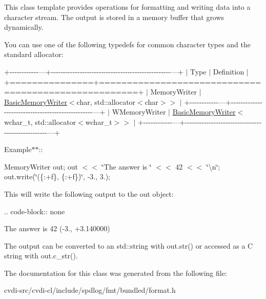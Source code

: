 This class template provides operations for formatting and writing data into a character stream. The output is stored in a memory buffer that grows dynamically.

You can use one of the following typedefs for common character types and the standard allocator\+:

+-\/-\/-\/-\/-\/-\/-\/-\/-\/-\/-\/-\/---+-\/-\/-\/-\/-\/-\/-\/-\/-\/-\/-\/-\/-\/-\/-\/-\/-\/-\/-\/-\/-\/-\/-\/-\/-\/-\/-\/-\/-\/-\/-\/-\/-\/-\/-\/-\/-\/-\/-\/-\/-\/-\/-\/-\/-\/-\/-\/-\/-\/-\/---+ $\vert$ Type $\vert$ Definition $\vert$ +===============+=====================================================+ $\vert$ Memory\+Writer $\vert$ \hyperlink{classfmt_1_1BasicMemoryWriter}{Basic\+Memory\+Writer}$<$char, std\+::allocator$<$char$>$$>$ $\vert$ +-\/-\/-\/-\/-\/-\/-\/-\/-\/-\/-\/-\/---+-\/-\/-\/-\/-\/-\/-\/-\/-\/-\/-\/-\/-\/-\/-\/-\/-\/-\/-\/-\/-\/-\/-\/-\/-\/-\/-\/-\/-\/-\/-\/-\/-\/-\/-\/-\/-\/-\/-\/-\/-\/-\/-\/-\/-\/-\/-\/-\/-\/-\/---+ $\vert$ W\+Memory\+Writer $\vert$ \hyperlink{classfmt_1_1BasicMemoryWriter}{Basic\+Memory\+Writer}$<$wchar\+\_\+t, std\+::allocator$<$wchar\+\_\+t$>$$>$ $\vert$ +-\/-\/-\/-\/-\/-\/-\/-\/-\/-\/-\/-\/---+-\/-\/-\/-\/-\/-\/-\/-\/-\/-\/-\/-\/-\/-\/-\/-\/-\/-\/-\/-\/-\/-\/-\/-\/-\/-\/-\/-\/-\/-\/-\/-\/-\/-\/-\/-\/-\/-\/-\/-\/-\/-\/-\/-\/-\/-\/-\/-\/-\/-\/---+

Example$\ast$$\ast$\+:\+:

Memory\+Writer out; out $<$$<$ \char`\"{}\+The answer is \char`\"{} $<$$<$ 42 $<$$<$ \char`\"{}\textbackslash{}n\char`\"{}; out.\+write(\char`\"{}(\{\+:+f\}, \{\+:+f\})\char`\"{}, -\/3., 3.);

This will write the following output to the {\ttfamily out} object\+:

.. code-\/block\+:\+: none

The answer is 42 (-\/3., +3.140000)

The output can be converted to an {\ttfamily std\+::string} with {\ttfamily out.\+str()} or accessed as a C string with {\ttfamily out.\+c\+\_\+str()}.  

The documentation for this class was generated from the following file\+:\begin{DoxyCompactItemize}
\item 
cvdi-\/src/cvdi-\/cl/include/spdlog/fmt/bundled/format.\+h\end{DoxyCompactItemize}
